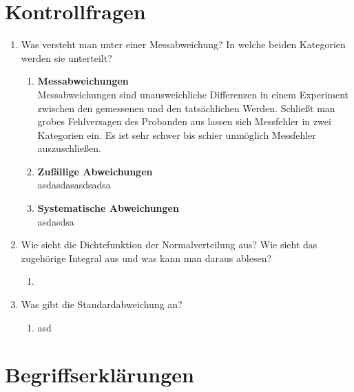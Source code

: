 \documentclass[fleqn,10pt]{olplainarticle}
\begin{document}
\section{Kontrollfragen}
 \begin{enumerate}
     \item Was versteht man unter einer Messabweichung? In welche beiden Kategorien werden sie unterteilt?
    \begin{enumerate}
        \item  \textbf{Messabweichungen} \cite{FATU} \\
        Messabweichungen sind unausweichliche Differenzen in einem Experiment zwischen den gemessenen und den tatsächlichen Werden. Schließt man grobes Fehlversagen des Probanden aus lassen sich Messfehler in zwei Kategorien ein. Es ist sehr schwer bis schier unmöglich Messfehler auszuschließen.
        \item \textbf{Zufällige Abweichungen} \cite{FATU} \\
        asdasdasasdsadsa
        \item \textbf{Systematische Abweichungen} \cite{FATU} \\
            asdasdsa
    \end{enumerate}
     \item Wie sieht die Dichtefunktion der Normalverteilung aus? Wie sieht das zugehörige Integral aus und was kann man daraus ablesen? 
     \begin{enumerate}
         \item 
     \end{enumerate}

     \item Was gibt die Standardabweichung an?  
     \begin{enumerate}
         \item asd
     \end{enumerate}
 \end{enumerate}

\section{Begriffserklärungen}



\end{document}
